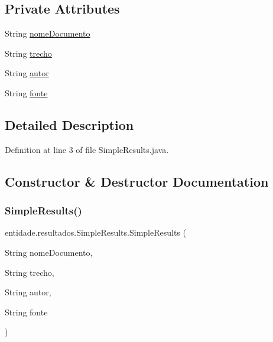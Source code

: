 \subsection*{Private Attributes}
\begin{DoxyCompactItemize}
\item 
String \hyperlink{classentidade_1_1resultados_1_1SimpleResults_a9dec340294219ec16a2e2b42e68ba350}{nome\+Documento}
\item 
String \hyperlink{classentidade_1_1resultados_1_1SimpleResults_a94e8f77e73a35a3a544f30de1d4fa5b6}{trecho}
\item 
String \hyperlink{classentidade_1_1resultados_1_1SimpleResults_afc17e94212f3953a05f63f9de5d4c345}{autor}
\item 
String \hyperlink{classentidade_1_1resultados_1_1SimpleResults_a2442d65af6ba817cd26d5bd41ef8c65c}{fonte}
\end{DoxyCompactItemize}


\subsection{Detailed Description}


Definition at line 3 of file Simple\+Results.\+java.



\subsection{Constructor \& Destructor Documentation}
\hypertarget{classentidade_1_1resultados_1_1SimpleResults_a36411d7a5b487a8cb8d49e5dc13cccc3}{}\label{classentidade_1_1resultados_1_1SimpleResults_a36411d7a5b487a8cb8d49e5dc13cccc3} 
\subsubsection{\texorpdfstring{Simple\+Results()}{SimpleResults()}\hspace{0.1cm}{\footnotesize\ttfamily [1/3]}}
{\footnotesize\ttfamily entidade.\+resultados.\+Simple\+Results.\+Simple\+Results (\begin{DoxyParamCaption}\item[{String}]{nome\+Documento,  }\item[{String}]{trecho,  }\item[{String}]{autor,  }\item[{String}]{fonte }\end{DoxyParamCaption})}



